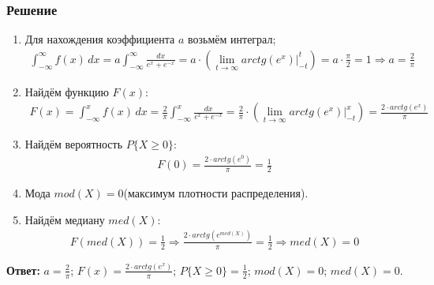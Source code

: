 \documentclass[14pt]{article}
\begin{document}
    \subsubsection*{Решение}
    \begin{enumerate}[wide, labelwidth=!, labelindent=0pt]
        \item Для нахождения коэффициента $a$ возьмём интеграл;
        \begin{gather*}
            \int_{-\infty}^{\infty} f(x) \, dx = a \int_{-\infty}^{\infty} \frac{dx}{e^x + e^{-x}} = a \cdot (\lim_{t\rightarrow\infty} arctg(e^x)\big|_{-t}^{t}) = a \cdot \frac{\pi}{2} = 1
            \Rightarrow a = \frac{2}{\pi}
        \end{gather*}
        \item Найдём функцию $F(x)$:
        \begin{gather*}
            F(x) = \int_{-\infty}^{x} f(x) \, dx = \frac{2}{\pi} \int_{-\infty}^{x} \frac{dx}{e^x + e^{-x}} = \frac{2}{\pi} \cdot (\lim_{t\rightarrow\infty} arctg(e^x)\big|_{-t}^{x}) = \frac{2 \cdot arctg(e^x)}{\pi}
        \end{gather*}
        \item Найдём вероятность $P\{X \geq 0 \}$:
        \begin{gather*}
            F(0) = \frac{2 \cdot arctg(e^0)}{\pi} = \frac{1}{2}
        \end{gather*}
        \item Мода $mod(X) = 0$(максимум плотности распределения).
        \item Найдём медиану $med(X)$:
        \begin{gather*}
            F(med(X)) = \frac{1}{2} \Rightarrow  \frac{2 \cdot arctg(e^{med(X)})}{\pi} = \frac{1}{2} \Rightarrow med(X) = 0
        \end{gather*}
    \end{enumerate}

    \hspace{150pt}\textbf{Ответ:} $a = \frac{2}{\pi}$; $F(x) = \frac{2 \cdot arctg(e^x)}{\pi}$; $P\{X \geq 0 \} = \frac{1}{2}$; $mod(X) = 0$; $med(X) = 0$.
\end{document}
